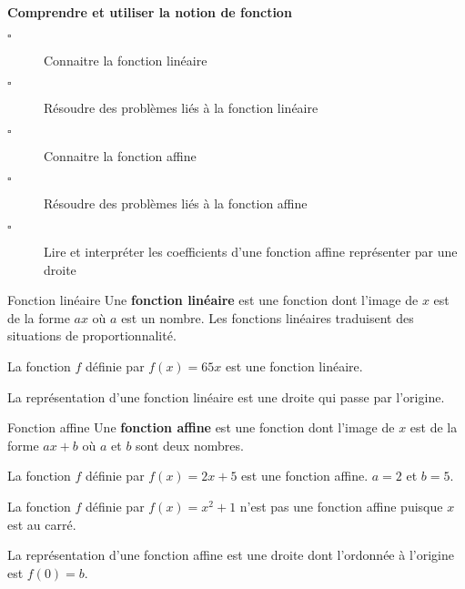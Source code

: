 \begin{titre}

\end{titre}


\begin{CpsCol}
\textbf{Comprendre et utiliser la notion de fonction}
\begin{description}
\item[$\square$] Connaitre la fonction linéaire
\item[$\square$] Résoudre des problèmes liés à la fonction linéaire
\item[$\square$] Connaitre la fonction affine
\item[$\square$] Résoudre des problèmes liés à la fonction affine
\item[$\square$] Lire et interpréter les coefficients d'une fonction affine représenter par une droite
\end{description}
\end{CpsCol}



\begin{DefT}{Fonction linéaire}
Une \textbf{fonction linéaire}  est une fonction dont l'image de $x$ est de la forme $ax$ où $a$ est un nombre. Les fonctions linéaires traduisent des situations de proportionnalité.
\end{DefT}

\begin{Ex}
La fonction $f$ définie par $f(x)=65x$ est une fonction linéaire. 
\end{Ex}

\begin{Rq}
La représentation d'une fonction linéaire est une droite qui passe par l'origine. 
\end{Rq}




\begin{DefT}{Fonction affine}
Une \textbf{fonction affine}  est une fonction dont l'image de $x$ est de la forme $ax+b$ où $a$ et $b$ sont deux nombres.
\end{DefT}


\begin{Ex}
La fonction $f$ définie par $f(x)=2x+ 5$ est une fonction affine. $a=2$ et $b=5$.
\end{Ex}

\begin{Att}
La fonction $f$ définie par $f(x)=x^2+ 1$ n'est pas une fonction affine puisque $x$ est au carré.
\end{Att}

\begin{Rq}
La représentation d'une fonction affine est une droite dont l'ordonnée à l'origine  est $f(0)=b$. 
\end{Rq}


